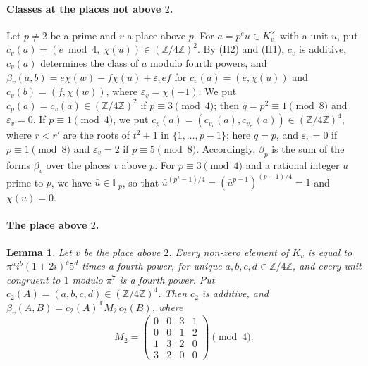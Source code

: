 \documentclass[11pt]{article}
\newtheorem{lemma}[theorem]{Lemma}
\newcommand{\Z}{\mathbb{Z}}
\newcommand{\F}{\mathbb{F}}
\begin{document}
\paragraph{Classes at the places not above $2$.} Let $p\neq2$ be a prime and $v$ a place above $p$. For $a=p^eu\in K_v^\times$ with a unit $u$, put $c_v(a)=(e\bmod4,\ \chi(u))\in(\Z/4\Z)^2$. By (H2) and (H1), $c_v$ is additive, $c_v(a)$ determines the class of $a$ modulo fourth powers, and $\beta_v(a,b)=e\chi(w)-f\chi(u)+\varepsilon_vef$ for $c_v(a)=(e,\chi(u))$ and $c_v(b)=(f,\chi(w))$, where $\varepsilon_v=\chi(-1)$. We put $c_p(a)=c_v(a)\in(\Z/4\Z)^2$ if $p\equiv3\pmod4$; then $q=p^2\equiv1\pmod8$ and $\varepsilon_v=0$. If $p\equiv1\pmod4$, we put $c_p(a)=(c_{v_r}(a),c_{v_{r'}}(a))\in(\Z/4\Z)^4$, where $r<r'$ are the roots of $t^2+1$ in $\{1,\dots,p-1\}$; here $q=p$, and $\varepsilon_v=0$ if $p\equiv1\pmod8$ and $\varepsilon_v=2$ if $p\equiv5\pmod8$. Accordingly, $\beta_p$ is the sum of the forms $\beta_v$ over the places $v$ above $p$. For $p\equiv3\pmod4$ and a rational integer $u$ prime to $p$, we have $\bar u\in\F_p$, so that $\bar u^{(p^2-1)/4}=(\bar u^{p-1})^{(p+1)/4}=1$ and $\chi(u)=0$.

\paragraph{The place above $2$.}
\begin{lemma}\label{lem:M2}
Let $v$ be the place above $2$. Every non-zero element of $K_v$ is equal to $\pi^a i^b(1+2i)^c5^d$ times a fourth power, for unique $a,b,c,d\in\Z/4\Z$, and every unit congruent to $1$ modulo $\pi^7$ is a fourth power. Put $c_2(A)=(a,b,c,d)\in(\Z/4\Z)^4$. Then $c_2$ is additive, and $\beta_v(A,B)=c_2(A)^{\mathsf T}M_2\,c_2(B)$, where
\[
M_2=\begin{pmatrix}0&0&3&1\\0&0&1&2\\1&3&2&0\\3&2&0&0\end{pmatrix}\pmod4.
\]
\end{lemma}
\end{document}
